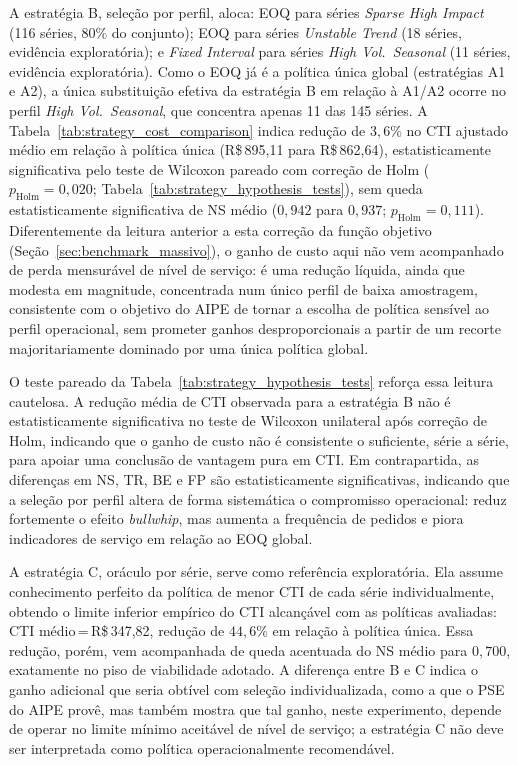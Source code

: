 A estratégia B, seleção por perfil, aloca: EOQ para séries \textit{Sparse High Impact} (116 séries, 80\% do conjunto); EOQ para séries \textit{Unstable Trend} (18 séries, evidência exploratória); e \textit{Fixed Interval} para séries \textit{High Vol.~Seasonal} (11 séries, evidência exploratória). Como o EOQ já é a política única global (estratégias A1 e A2), a única substituição efetiva da estratégia B em relação à A1/A2 ocorre no perfil \textit{High Vol.~Seasonal}, que concentra apenas 11 das 145 séries. A Tabela~\ref{tab:strategy_cost_comparison} indica redução de $3{,}6\%$ no CTI ajustado médio em relação à política única (R\$\,895,11 para R\$\,862,64), estatisticamente significativa pelo teste de Wilcoxon pareado com correção de Holm ($p_{\text{Holm}}=0{,}020$; Tabela~\ref{tab:strategy_hypothesis_tests}), sem queda estatisticamente significativa de NS médio ($0{,}942$ para $0{,}937$; $p_{\text{Holm}}=0{,}111$). Diferentemente da leitura anterior a esta correção da função objetivo (Seção~\ref{sec:benchmark_massivo}), o ganho de custo aqui não vem acompanhado de perda mensurável de nível de serviço: é uma redução líquida, ainda que modesta em magnitude, concentrada num único perfil de baixa amostragem, consistente com o objetivo do AIPE de tornar a escolha de política sensível ao perfil operacional, sem prometer ganhos desproporcionais a partir de um recorte majoritariamente dominado por uma única política global.

O teste pareado da Tabela~\ref{tab:strategy_hypothesis_tests} reforça essa leitura cautelosa. A redução média de CTI observada para a estratégia B não é estatisticamente significativa no teste de Wilcoxon unilateral após correção de Holm, indicando que o ganho de custo não é consistente o suficiente, série a série, para apoiar uma conclusão de vantagem pura em CTI. Em contrapartida, as diferenças em NS, TR, BE e FP são estatisticamente significativas, indicando que a seleção por perfil altera de forma sistemática o compromisso operacional: reduz fortemente o efeito \textit{bullwhip}, mas aumenta a frequência de pedidos e piora indicadores de serviço em relação ao EOQ global.

A estratégia C, oráculo por série, serve como referência exploratória. Ela assume conhecimento perfeito da política de menor CTI de cada série individualmente, obtendo o limite inferior empírico do CTI alcançável com as políticas avaliadas: CTI médio\,=\,R\$\,347,82, redução de $44{,}6\%$ em relação à política única. Essa redução, porém, vem acompanhada de queda acentuada do NS médio para $0{,}700$, exatamente no piso de viabilidade adotado. A diferença entre B e C indica o ganho adicional que seria obtível com seleção individualizada, como a que o PSE do AIPE provê, mas também mostra que tal ganho, neste experimento, depende de operar no limite mínimo aceitável de nível de serviço; a estratégia C não deve ser interpretada como política operacionalmente recomendável.

